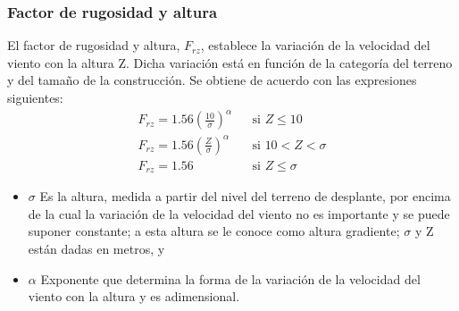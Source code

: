 \subsubsection{Factor de rugosidad y altura}
El factor de rugosidad y altura, $F_{rz}$, establece la variación de la
velocidad del viento con la altura Z. Dicha variación está en
función de la categoría del terreno y del tamaño de la
construcción.
Se obtiene de acuerdo con las expresiones siguientes:
\begin{align*}
F_{rz} = 1.56 \left(\frac{10}{\sigma}\right)^{\alpha}&& \text{si } Z\leq 10\\
F_{rz} = 1.56 \left(\frac{Z}{\sigma}\right)^{\alpha}&& \text{si } 10 < Z < \sigma\\
F_{rz} = 1.56 && \text{si } Z\leq \sigma
\end{align*}
\begin{notation}
    \begin{itemize}
        \item $\sigma$ Es la altura, medida a partir del nivel del terreno de desplante, por encima de la cual la variación de la velocidad del viento no es importante y se puede suponer constante; a esta altura se le conoce como altura gradiente; $\sigma$ y Z están dadas en metros, y
        \item $\alpha$ Exponente que determina la forma de la variación de la velocidad del viento con la altura y es adimensional.
    \end{itemize}
\end{notation}